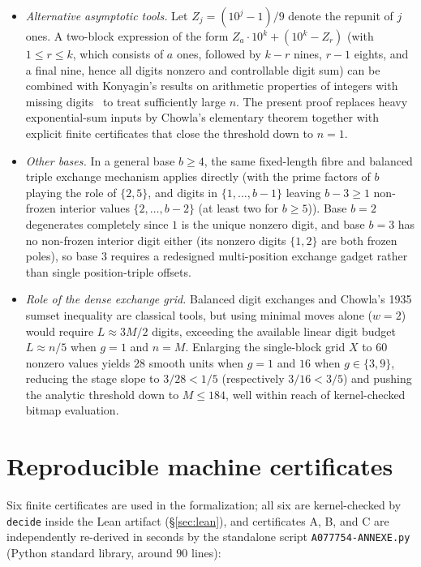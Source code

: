 \documentclass[11pt]{article}
\theoremstyle{remark}
\begin{document}
\begin{itemize}
\item \emph{Alternative asymptotic tools.} Let $Z_j = (10^j - 1)/9$ denote the
repunit of $j$ ones. A two-block expression of the form
$Z_a \cdot 10^k + (10^k - Z_r)$ (with $1 \le r \le k$, which consists of $a$
ones, followed by $k-r$ nines, $r-1$ eights, and a final nine, hence all digits
nonzero and controllable digit sum) can be combined with Konyagin's results on
arithmetic properties of integers with missing digits~\cite{konyagin} to treat
sufficiently large $n$. The present proof replaces heavy exponential-sum inputs
by Chowla's elementary theorem together with explicit finite certificates that
close the threshold down to $n = 1$.
\item \emph{Other bases.} In a general base $b \ge 4$, the same fixed-length
fibre and balanced triple exchange mechanism applies directly (with the prime
factors of $b$ playing the role of $\{2,5\}$, and digits in $\{1,\dots,b-1\}$
leaving $b - 3 \ge 1$ non-frozen interior values $\{2,\dots,b-2\}$ (at least
two for $b \ge 5$)). Base $b = 2$
degenerates completely since $1$ is the unique nonzero digit, and base $b = 3$
has no non-frozen interior digit either (its nonzero digits $\{1,2\}$ are both
frozen poles), so base $3$ requires a redesigned multi-position exchange gadget
rather than single position-triple offsets.
\item \emph{Role of the dense exchange grid.} Balanced digit exchanges and
Chowla's 1935 sumset inequality are classical tools, but using minimal moves
alone ($w = 2$) would require $L \approx 3M/2$ digits, exceeding the available
linear digit budget $L \approx n/5$ when $g = 1$ and $n = M$. Enlarging the
single-block grid $X$ to $60$ nonzero values yields $28$ smooth units when
$g = 1$ and $16$ when $g \in \{3,9\}$, reducing the stage slope to $3/28 < 1/5$
(respectively $3/16 < 3/5$) and pushing the analytic threshold down to
$M \le 184$, well within reach of kernel-checked bitmap evaluation.
\end{itemize}

\appendix
\section{Reproducible machine certificates}

Six finite certificates are used in the formalization; all six are
kernel-checked by \texttt{decide} inside the Lean artifact (\S\ref{sec:lean}),
and certificates A, B, and C are independently re-derived in seconds by the
standalone script \texttt{A077754-ANNEXE.py} (Python standard library, around
$90$ lines):
\end{document}
